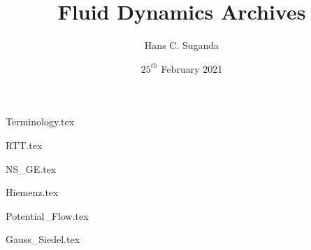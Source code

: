 \documentclass[a4paper, 12pt]{report}
\begin{document}
\title{Fluid Dynamics Archives}
\author{Hans C. Suganda}
\date{$25^{th}$ February 2021}
\maketitle
\newpage

\tableofcontents

\begin{center}
{Terminology.tex}
\begin{comment}
Start Level: Chapter
End Level: Chapter
Aditional Comments:
\end{comment}
{RTT.tex}
\begin{comment}
Start Level: Chapter
End Level: Chapter
Aditional Comments:
\end{comment}
{NS_GE.tex}
\begin{comment}
Start Level: Chapter
End Level: Chapter
Aditional Comments:
\end{comment}
{Hiemenz.tex}
\begin{comment}
Start Level: Chapter
End Level: Chapter
Aditional Comments:
\end{comment}
{Potential_Flow.tex}
\begin{comment}
Start Level: Chapter
End Level: Chapter
Aditional Comments:
\end{comment}
{Gauss_Siedel.tex}
\begin{comment}

\end{comment}
\end{center}
\end{document}
